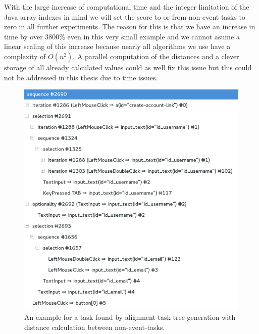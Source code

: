 With the large increase of computational time and the integer limitation of the Java array indexes in mind we will set the score to or from non-event-tasks to zero in all further experiments.
The reason for this is that we have an increase in time by over 3800\% even in this very small example and we cannot asume a linear scaling of this increase because nearly all algorithms we use have a complexity of $O(n^2)$.
A parallel computation of the distances and a clever storage of all already calculated values could as well fix this issue but this could not be addressed in this thesis due to time issues.

\begin{figure}[h]
	\centering
	\includegraphics[width=\textwidth]{chapters/casestudy/noneventcreateaccount.png}
	\caption{An example for a task found by alignment task tree generation with distance calculation between non-event-tasks.}
	\label{fig:noneventaccountcreation}
\end{figure}

